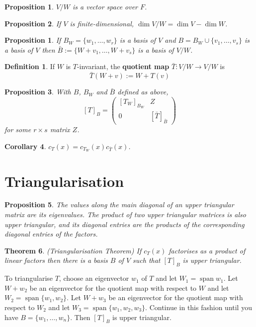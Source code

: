 \documentclass[12pt]{article}
\newtheorem{thm}{Theorem}[section]
\newtheorem{cor}[thm]{Corollary}
\newtheorem{prop}[thm]{Proposition}
\newtheorem*{prop*}{Proposition}
\theoremstyle{definition}
\newtheorem*{defn*}{Definition}
\DeclareMathOperator{\spn}{span}
\begin{document}
\begin{prop}
	$V / W$ is a vector space over $F$.
\end{prop}

\begin{prop}
	If $V$ is finite-dimensional, $\dim{V / W} = \dim{V} - \dim{W}$.
\end{prop}

\begin{prop*}
	If $B_W = \{w_1, \ldots, w_r\}$ is a basis of $V$ and $B = B_W \cup \{v_1, \ldots, v_s\}$ is a basis of $V$ then $\bar{B} := \{W + v_1, \ldots, W + v_s\}$ is a basis of $V / W$.
\end{prop*}

\begin{defn*}
	If $W$ is $T$-invariant, the \textbf{quotient map} $\bar{T} : V / W \to V / W$ is
	$$\bar{T}(W + v) := W + T(v)$$
\end{defn*}

\begin{prop}
	With $B$, $B_W$ and $\bar{B}$ defined as above,
	$$[T]_B = \begin{pmatrix} [T_W]_{B_W} & Z \\ 0 & [\bar{T}]_{\bar{B}} \end{pmatrix}$$
	for some $r \times s$ matrix $Z$.
\end{prop}

\begin{cor}
	$c_T(x) = c_{T_W}(x)c_{\bar{T}}(x)$.
\end{cor}

\section{Triangularisation}

\begin{prop}
	The values along the main diagonal of an upper triangular matrix are its eigenvalues.
	The product of two upper triangular matrices is also upper triangular, and its diagonal entries are the products of the corresponding diagonal entries of the factors.
\end{prop}

\begin{thm}
	(Triangularisation Theorem)
	If $c_T(x)$ factorises as a product of linear factors then there is a basis $B$ of $V$ such that $[T]_B$ is upper triangular.
\end{thm}

\noindent To triangularise $T$, choose an eigenvector $w_1$ of $T$ and let $W_1 = \spn{w_1}$.
Let $W + w_2$ be an eigenvector for the quotient map with respect to $W$ and let $W_2 = \spn{\{w_1, w_2\}}$.
Let $W + w_3$ be an eigenvector for the quotient map with respect to $W_2$ and let $W_3 = \spn{\{w_1, w_2, w_3\}}$.
Continue in this fashion until you have $B = \{w_1, \ldots, w_n\}$.
Then $[T]_B$ is upper triangular.
\end{document}
